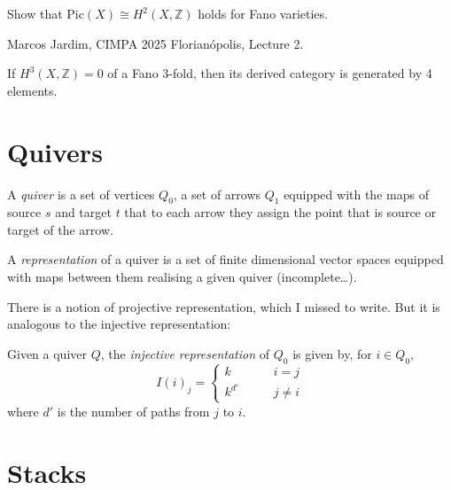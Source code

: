 \begin{exercise}
\label{exercise-Pic-H2-Fano}
Show that  $\text{Pic}(X)\cong H^{2}(X,\mathbb{Z})$ holds for Fano varieties.
\end{exercise}

\begin{remark}
\label{remark-derived-category-of-Fano-3-folds-with-vanishing-simplicial
-cohomology}
\begin{reference}
Marcos Jardim, CIMPA 2025 Florianópolis, Lecture 2.
\end{reference}
If $H^3(X,\mathbb{Z})=0$ of a Fano 3-fold, then its derived category is
generated by 4 elements.
\end{remark}


\section{Quivers}
\label{section-quivers}

\begin{definition}
\label{definition-quiver}
A {\it quiver} is a set of vertices $Q_0$, a set of arrows $Q_1$ equipped with
the maps of source $s$ and target $t$ that to each arrow they assign the point
that is source or target of the arrow.
\end{definition}

\begin{definition}
\label{definition-representation-of-quiver}
A {\it representation} of a quiver is a set of finite dimensional vector spaces
equipped with maps between them realising a given quiver (incomplete…).
\end{definition}

There is a notion of projective representation, which I missed to write. But it
is analogous to the injective representation:

\begin{definition}
\label{definition-injective-representation-of-quivers}
Given a quiver $Q$, the {\it injective representation} of $Q_0$ is given by, for
$i \in Q_0$,
$$
I(i)_j=\begin{cases}
k\qquad &i=j \\
k^{d'}\qquad &j \neq i
\end{cases}
$$
where $d'$ is the number of paths from $j$ to $i$.
\end{definition}

\section{Stacks}
\label{section-stacks}

